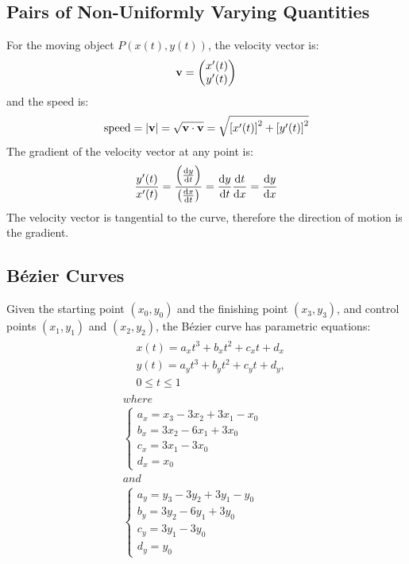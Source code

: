 \documentclass[10pt, a4paper, titlepage]{article}
\begin{document}
\begin{multicols*}{3}
	\dotfill
	\subsection{Pairs of Non-Uniformly Varying Quantities}
	For the moving object $P(x(t),y(t))$, the velocity vector is:
	\begin{align}
		\vb{v}=\begin{pmatrix}x'(t)\\ y'(t) \end{pmatrix}
	\end{align}
	and the speed is:
	\begin{align}
		\text{speed}=|\vb{v}|=\sqrt{\vb{v}\cdot \vb{v}}=\sqrt{\left[x'(t)\right]^2+\left[y'(t)\right]^2}
	\end{align}
	The gradient of the velocity vector at any point is:
	\begin{align}
		\frac{y'(t)}{x'(t)}=\frac{\left(\dv{y}{t}\right)}{\left(\dv{x}{t}\right)}=\dv{y}{t}\dv{t}{x}=\dv{y}{x}
	\end{align}
	The velocity vector is tangential to the curve, therefore the direction of motion is the gradient.

	\dotfill
	\subsection{B\'ezier Curves}
	Given the starting point $(x_0,y_0)$ and the finishing point $(x_3,y_3)$, and control points $(x_1,y_1)$ and $(x_2,y_2)$, the B\'ezier curve has parametric equations:
	\begin{gather}
		\begin{align}
			&x(t)=a_xt^3+b_xt^2+c_xt+d_x\\
			&y(t)=a_yt^3+b_yt^2+c_yt+d_y,\\
			&0\leq t\leq 1
		\end{align}\\
		where\\
		\begin{cases}
			a_x=x_3-3x_2+3x_1-x_0\\
			b_x=3x_2-6x_1+3x_0\\
			c_x=3x_1-3x_0\\
			d_x=x_0
		\end{cases}\\
		and\\
		\begin{cases}
			a_y=y_3-3y_2+3y_1-y_0\\
			b_y=3y_2-6y_1+3y_0\\
			c_y=3y_1-3y_0\\
			d_y=y_0
		\end{cases}
	\end{gather}
	

\end{multicols*}
\end{document}
